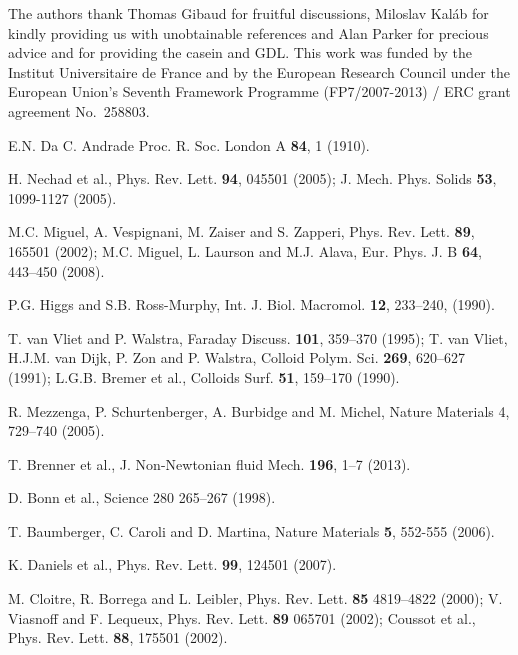 \documentclass[twocolumn,superscriptaddress,showpacs,preprintnumbers,amsmath,amssymb,prl]{revtex4}
\begin{document}


\begin{acknowledgments}
The authors thank Thomas Gibaud for fruitful discussions, Miloslav Kal\'ab for kindly providing us with unobtainable references and Alan Parker for precious advice and for providing the casein and GDL. This work was funded by the Institut Universitaire de France and by the European Research Council under the European Union's Seventh Framework Programme (FP7/2007-2013) / ERC grant agreement No.~258803. 
\end{acknowledgments}

\begin{thebibliography}{}

 E.N. Da C. Andrade Proc. R. Soc. London A {\bf 84}, 1 (1910).

 H. Nechad et al., Phys. Rev. Lett. {\bf 94}, 045501 (2005); J. Mech. Phys. Solids {\bf 53}, 1099-1127 (2005).

 M.C. Miguel, A. Vespignani, M. Zaiser and S. Zapperi, Phys. Rev. Lett. {\bf 89}, 165501 (2002); M.C. Miguel, L. Laurson and M.J. Alava, Eur. Phys. J. B {\bf 64}, 443--450 (2008).

 P.G. Higgs and S.B. Ross-Murphy, Int. J. Biol. Macromol. {\bf 12}, 233--240, (1990).

 T. van Vliet and P. Walstra, Faraday Discuss. {\bf 101}, 359--370 (1995); T. van Vliet, H.J.M. van Dijk, P. Zon and P. Walstra, Colloid Polym. Sci. {\bf 269}, 620--627 (1991); L.G.B. Bremer et al., Colloids Surf. {\bf 51}, 159--170 (1990).

 R. Mezzenga, P. Schurtenberger, A. Burbidge and M. Michel, Nature Materials {4}, 729--740 (2005).

 T. Brenner et al., J. Non-Newtonian fluid Mech. {\bf 196}, 1--7 (2013).

 D. Bonn et al., Science {280} 265--267 (1998).

 T. Baumberger, C. Caroli and D. Martina, Nature Materials {\bf 5}, 552-555 (2006).

 K. Daniels et al., Phys. Rev. Lett. {\bf 99}, 124501 (2007).

 M. Cloitre, R. Borrega and L. Leibler, Phys. Rev. Lett. {\bf 85} 4819--4822 (2000); V. Viasnoff and F. Lequeux, Phys. Rev. Lett. {\bf 89} 065701 (2002); Coussot et al., Phys. Rev. Lett. {\bf 88}, 175501 (2002).


\end{thebibliography}
\end{document}
